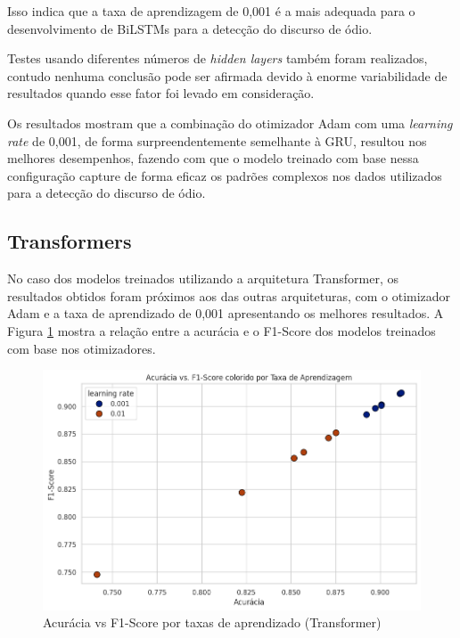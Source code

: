 \documentclass[conference]{IEEEtran}
\begin{document}
Isso indica que a taxa de aprendizagem de 0,001 é a mais adequada para o desenvolvimento de BiLSTMs para a detecção do discurso de ódio.

Testes usando diferentes números de \textit{hidden layers} também foram realizados, contudo nenhuma conclusão pode ser afirmada devido à enorme variabilidade de resultados quando esse fator foi levado em consideração.

Os resultados mostram que a combinação do otimizador Adam com uma \textit{learning rate} de 0,001, de forma surpreendentemente semelhante à GRU, resultou nos melhores desempenhos, fazendo com que o modelo treinado com base nessa configuração capture de forma eficaz os padrões complexos nos dados utilizados para a detecção do discurso de ódio.

\subsection{Transformers}

No caso dos modelos treinados utilizando a arquitetura Transformer, os resultados obtidos foram próximos aos das outras arquiteturas, com o otimizador Adam e a taxa de aprendizado de 0,001 apresentando os melhores resultados. A Figura \ref{fig:transformer_acu_lr} mostra a relação entre a acurácia e o F1-Score dos modelos treinados com base nos otimizadores.

\begin{figure}[h!]
    \centering
    \includegraphics[width=\linewidth]{images/transformer_acu_lr.png}
    \caption{Acurácia vs F1-Score por taxas de aprendizado (Transformer)}
    \label{fig:transformer_acu_lr}
\end{figure}
\end{document}
